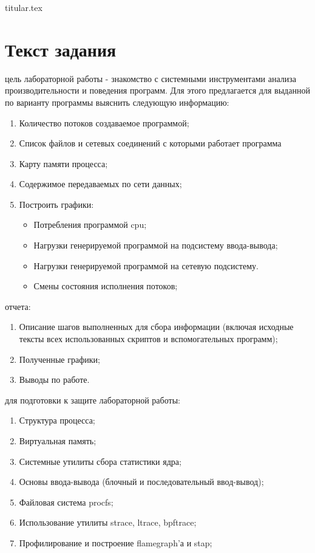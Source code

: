 \documentclass[11pt, a4paper]{article}
\begin{document}
{titular.tex}

\newpage

\section{Текст задания}
 цель лабораторной работы - знакомство с системными инструментами анализа производительности и поведения программ. Для этого предлагается для выданной по варианту программы выяснить следующую информацию:

\begin{enumerate}
  \item Количество потоков создаваемое программой;
  \item Список файлов и сетевых соединений с которыми работает программа
  \item Карту памяти процесса;
  \item Содержимое передаваемых по сети данных;
  \item Построить графики:
  \begin{itemize}
    \item Потребления программой cpu;
    \item Нагрузки генерируемой программой на подсистему ввода-вывода;
    \item Нагрузки генерируемой программой на сетевую подсистему.
    \item Смены состояния исполнения потоков;
  \end{itemize}
\end{enumerate}

\smallskip

 отчета:
\begin{enumerate}
  \item Описание шагов выполненных для сбора информации (включая исходные тексты всех использованных скриптов и вспомогательных программ);
  \item  Полученные графики;
  \item  Выводы по работе.
\end{enumerate}

 для подготовки к защите лабораторной работы:
\begin{enumerate}
  \item Структура процесса;
  \item Виртуальная память;
  \item Системные утилиты сбора статистики ядра;
  \item Основы ввода-вывода (блочный и последовательный ввод-вывод);
  \item Файловая система procfs;
  \item Использование утилиты strace, ltrace, bpftrace;
  \item Профилирование и построение flamegraph'а и stap;
\end{enumerate}
\end{document}
